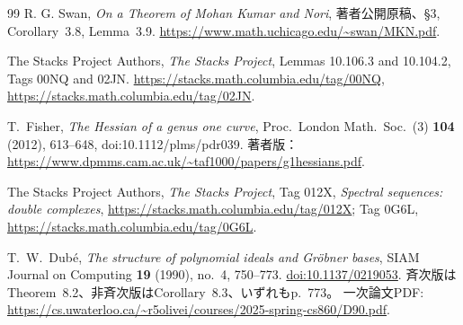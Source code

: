 \documentclass[a4paper,11pt]{ltjsarticle}
\theoremstyle{definition}
\begin{document}
\begin{thebibliography}{99}
R. G. Swan,
\emph{On a Theorem of Mohan Kumar and Nori},
著者公開原稿、\S3, Corollary~3.8, Lemma~3.9.
\url{https://www.math.uchicago.edu/~swan/MKN.pdf}.

The Stacks Project Authors,
\emph{The Stacks Project},
Lemmas 10.106.3 and 10.104.2, Tags 00NQ and 02JN.
\url{https://stacks.math.columbia.edu/tag/00NQ},
\url{https://stacks.math.columbia.edu/tag/02JN}.


T.~Fisher,
\emph{The Hessian of a genus one curve},
Proc.\ London Math.\ Soc.\ (3) \textbf{104} (2012), 613--648,
doi:10.1112/plms/pdr039.
著者版：\url{https://www.dpmms.cam.ac.uk/~taf1000/papers/g1hessians.pdf}.

The Stacks Project Authors,
\emph{The Stacks Project},
Tag 012X, \emph{Spectral sequences: double complexes},
\url{https://stacks.math.columbia.edu/tag/012X};
Tag 0G6L,
\url{https://stacks.math.columbia.edu/tag/0G6L}.

T.~W.~Dub\'e,
\emph{The structure of polynomial ideals and Gr\"obner bases},
SIAM Journal on Computing \textbf{19} (1990), no.~4, 750--773.
\href{https://doi.org/10.1137/0219053}{doi:10.1137/0219053}.
斉次版はTheorem~8.2、非斉次版はCorollary~8.3、いずれもp.~773。
一次論文PDF:
\url{https://cs.uwaterloo.ca/~r5olivei/courses/2025-spring-cs860/D90.pdf}.

\end{thebibliography}
\end{document}
